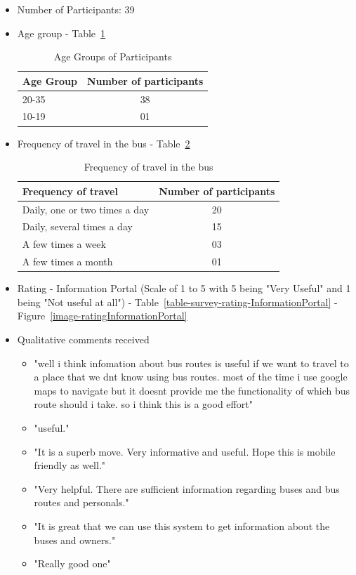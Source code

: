 \documentclass[12pt, oneside]{report}
\begin{document}
\begin {itemize}

\item Number of Participants: 39

\item Age group - Table~\ref{table-survey-ageGroupOfSurveyParticipants}

\begin{table} [h]
\centering
\begin{tabular}{|l|c|}
\hline
Age Group & Number of participants \\
\hline
20-35	&38 \\
10-19	&01 \\
\hline
\end{tabular}
\caption{Age Groups of Participants}
\label{table-survey-ageGroupOfSurveyParticipants}
\end{table}

\item Frequency of travel in the bus - Table~\ref{table-survey-frequencyOfTravelInTheBus}

\begin{table} [h]
\centering
\begin{tabular}{|l|c|}
\hline
Frequency of travel & Number of participants \\
\hline
Daily, one or two times a day	&20 \\
Daily, several times a day	&15 \\
A few times a week	&03 \\
A few times a month	&01 \\
\hline
\end{tabular}
\caption{Frequency of travel in the bus}
\label{table-survey-frequencyOfTravelInTheBus}
\end{table}

\item Rating - Information Portal (Scale of 1 to 5 with 5 being "Very Useful" and 1 being "Not useful at all") - Table~\ref{table-survey-rating-InformationPortal} - Figure~\ref{image-ratingInformationPortal}

\item Qualitative comments received
\begin {itemize}
\item "well i think infomation about bus routes is useful if we want to travel to a place that we dnt know using bus routes. most of the time i use google maps to navigate but it doesnt provide me the functionality of which bus route should i take. so i think this is a good effort"
\item "useful."
\item "It is a superb move. Very informative and useful. Hope this is mobile friendly as well."
\item "Very helpful. There are sufficient information regarding buses and bus routes and personals."
\item "It is great that we can use this system to get information about the buses and owners."
\item "Really good one"
\end {itemize}


\end{itemize}
\end{document}
